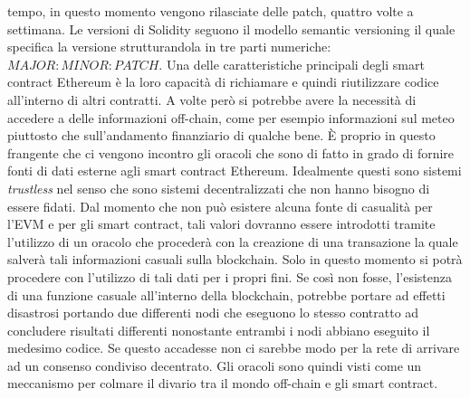 tempo, in questo momento vengono rilasciate delle patch, quattro volte a settimana. Le versioni di Solidity seguono il modello semantic versioning il quale specifica la versione strutturandola in tre parti numeriche: $MAJOR:MINOR:PATCH$. Una delle caratteristiche principali degli smart contract Ethereum è la loro capacità di richiamare e quindi riutilizzare codice all'interno di altri contratti. A volte però si potrebbe avere la necessità di accedere a delle informazioni off-chain, come per esempio informazioni sul meteo piuttosto che sull'andamento finanziario di qualche bene. \`E proprio in questo frangente che ci vengono incontro gli oracoli che sono di fatto in grado di fornire fonti di dati esterne agli smart contract Ethereum. Idealmente questi sono sistemi \textit{trustless} nel senso che sono sistemi decentralizzati che non hanno bisogno di essere fidati. Dal momento che non può esistere alcuna fonte di casualità per l'EVM e per gli smart contract, tali valori dovranno essere introdotti tramite l'utilizzo di un oracolo che procederà con la creazione di una transazione la quale salverà tali informazioni casuali sulla blockchain. Solo in questo momento si potrà procedere con l'utilizzo di tali dati per i propri fini. Se così non fosse, l'esistenza di una funzione casuale all'interno della blockchain, potrebbe portare ad effetti disastrosi portando due differenti nodi che eseguono lo stesso contratto ad concludere risultati differenti nonostante entrambi i nodi abbiano eseguito il medesimo codice. Se questo accadesse non ci sarebbe modo per la rete di arrivare ad un consenso condiviso decentrato. Gli oracoli sono quindi visti come un meccanismo per colmare il divario tra il mondo off-chain e gli smart contract.

